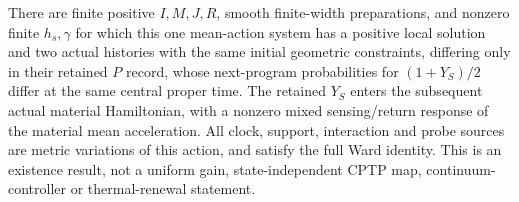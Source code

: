 \begin{proposition}
\label{prop:finite-spatial-return}
There are finite positive $I,M,J,R$, smooth finite-width preparations,
and nonzero finite $h_s,\gamma$ for which this one mean-action system has
a positive local solution and two actual histories with the same initial
geometric constraints, differing only in their retained $P$ record,
whose next-program probabilities for $(1+Y_S)/2$ differ at the same
central proper time. The retained $Y_S$ enters the subsequent actual
material Hamiltonian, with a nonzero mixed sensing/return response of
the material mean acceleration. All clock, support, interaction
and probe sources are metric variations of this action, and satisfy the
full Ward identity. This is an existence result, not a uniform gain,
state-independent CPTP map, continuum-controller or thermal-renewal
statement.
\end{proposition}

